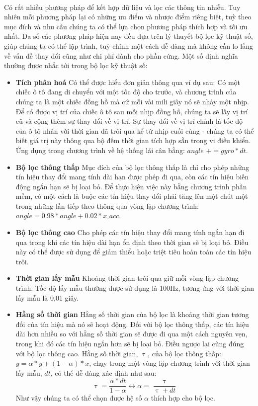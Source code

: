 \paragraph{}Có rất nhiều phương pháp để kết hợp dữ liệu và lọc các thông tin nhiễu. Tuy nhiên mỗi phương pháp lại có những ưu điểm và nhược điểm riêng biệt, tuỳ theo mục đích và nhu cầu chúng ta có thể lựa chọn phương pháp thích hợp và tối ưu nhất. Đa số các phương pháp hiện nay đều dựa trên lý thuyết bộ lọc kỹ thuật số, giúp chúng ta có thể lập trình, tuỳ chỉnh một cách dễ dàng mà không cần lo lắng về vấn đề thay đổi cũng như chi phí dành cho phần cứng. Một số định nghĩa thường được nhắc tới trong bộ lọc kỹ thuật số:
\begin{itemize}
	\item \textbf{Tích phân hoá} Có thể được hiểu đơn giản thông qua ví dụ sau: Có một chiếc ô tô đang di chuyển với một tốc độ cho trước, và chương trình của chúng ta là một chiếc đồng hồ mà cứ mỗi vài mili giây nó sẽ nhảy một nhịp. Để có được vị trí của chiếc ô tô sau mỗi nhịp đồng hồ, chúng ta sẽ lấy vị trí cũ và cộng thêm sự thay đổi về vị trí. Sự thay đổi về vị trí chính là tốc độ của ô tô nhân với thời gian đã trôi qua kể từ nhịp cuối cùng - chúng ta có thể biết giá trị này thông qua bộ đếm thời gian tích hợp sẵn trong vi điều khiển. Ứng dụng trong chương trình về hệ thống lái cân bằng: $angle$ $+$$= gyro * dt$.
	\item \textbf{Bộ lọc thông thấp} Mục đích của bộ lọc thông thấp là chỉ cho phép những tín hiệu thay đổi mang tính dài hạn được phép đi qua, còn các tín hiệu biến động ngắn hạn sẽ bị loại bỏ. Để thực hiện việc này bằng chương trình phần mềm, có một cách là buộc các tín hiệu thay đổi phải tăng lên một chút một trong những lần tiếp theo thông qua vòng lặp chương trình: $angle = 0.98 * angle + 0.02 * x\_acc$.
	\item \textbf{Bộ lọc thông cao} Cho phép các tín hiệu thay đổi mang tính ngắn hạn đi qua trong khi các tín hiệu dài hạn ổn định theo thời gian sẽ bị loại bỏ. Điều này có thể được sử dụng để giảm thiểu hoặc triệt tiêu hoàn toàn các tín hiệu trôi. 
	\item \textbf{Thời gian lấy mẫu} Khoảng thời gian trôi qua giữ mỗi vòng lặp chương trình. Tốc độ lấy mẫu thường được sử dụng là 100Hz, tương ứng với thời gian lấy mẫu là 0,01 giây. 
	\item \textbf{Hằng số thời gian} Hằng số thời gian của bộ lọc là khoảng thời gian tương đối của tín hiệu mà nó sẽ hoạt động. Đối với bộ lọc thông thấp, các tín hiệu dài hơn nhiều so với hằng số thời gian sẽ được đi qua một cách nguyên vẹn, trong khi đó các tín hiệu ngắn hơn sẽ bị loại bỏ. Điều ngược lại cũng đúng với bộ lọc thông cao. Hằng số thời gian, $\uptau$, của bộ lọc thông thấp: $y = \alpha * y + (1-\alpha) * x$, chạy trong một vòng lặp chương trình với thời gian lấy mẫu, $dt$, có thể dễ dàng xác định như sau: 
	\begin{equation}
	\uptau = \dfrac{\alpha*dt}{1-\alpha} \leftrightarrow \alpha = \dfrac{\uptau}{\uptau + dt}
	\end{equation}
	Như vậy chúng ta có thể chọn được hệ số $\alpha$ thích hợp cho bộ lọc.
\end{itemize}
